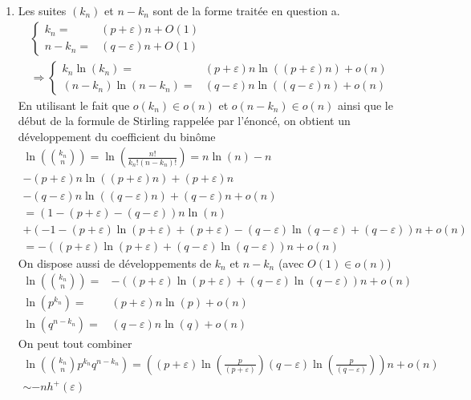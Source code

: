\begin{enumerate}
\begin{enumerate}
 \item Les suites $(k_n)$ et $n-k_n$ sont de la forme traitée en question a.
 \begin{multline*}
\left\lbrace 
\begin{aligned}
 k_n =& (p+\varepsilon)n + O(1) \\ n-k_n =& (q-\varepsilon)n + O(1)
\end{aligned}
\right. \\
\Rightarrow
\left\lbrace 
\begin{aligned}
 k_n \ln(k_n) =& (p+\varepsilon)n\ln\left( (p+\varepsilon)n\right) + o(n) \\
(n-k_n) \ln(n-k_n) =& (q-\varepsilon)n\ln\left( (q-\varepsilon)n\right) + o(n) 
\end{aligned}
\right. 
 \end{multline*}
En utilisant le fait que $o(k_n)\in o(n)$ et $o(n-k_n)\in o(n)$ ainsi que le début de la formule de Stirling rappelée par l'énoncé, on obtient un développement du coefficient du binôme
\begin{multline*}
 \ln\left( \binom{k_n}{n}\right)  = \ln\left( \frac{n!}{k_n !(n-k_n)!}\right) 
 = n\ln(n) - n \\
 - (p+\varepsilon)n\ln\left( (p+\varepsilon)n\right)  + (p+\varepsilon)n \\
 - (q-\varepsilon)n\ln\left( (q-\varepsilon)n\right)  + (q-\varepsilon)n +o(n) \\
= \left( 1-(p+\varepsilon) -(q-\varepsilon) \right)n\ln(n) \\
+ \left( -1 -(p+\varepsilon)\ln(p+\varepsilon) + (p+\varepsilon) -(q-\varepsilon)\ln(q-\varepsilon)+ (q-\varepsilon)\right)n +o(n) \\
= -\left( (p+\varepsilon)\ln(p+\varepsilon) + (q-\varepsilon)\ln(q-\varepsilon)\right)n +o(n) 
\end{multline*}
On dispose aussi de développements de $k_n$ et $n-k_n$ (avec $O(1)\in o(n)$)
\begin{align*}
\ln\left( \binom{k_n}{n}\right)  =& -\left( (p+\varepsilon)\ln(p+\varepsilon) + (q-\varepsilon)\ln(q-\varepsilon)\right)n +o(n)\\
 \ln(p^{k_n}) =& (p+\varepsilon)n\ln(p) + o(n) \\
 \ln(q^{n-k_n}) =& (q-\varepsilon)n\ln(q) + o(n)
\end{align*}
On peut tout combiner
\begin{multline*}
 \ln\left( \binom{k_n}{n} p^{k_n}q^{n-k_n}\right)
= 
\left( 
(p+\varepsilon)\ln\left( \frac{p}{(p+\varepsilon)}\right) 
(q-\varepsilon)\ln\left( \frac{p}{(q-\varepsilon)}\right)
\right) n + o(n)\\
\sim -nh^+(\varepsilon)
\end{multline*}


\end{enumerate}
\end{enumerate}
